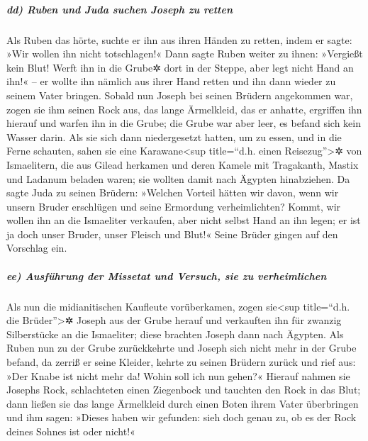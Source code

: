 \hypertarget{dd-ruben-und-juda-suchen-joseph-zu-retten}{%
\subparagraph{dd) Ruben und Juda suchen Joseph zu
retten}\label{dd-ruben-und-juda-suchen-joseph-zu-retten}}

 Als Ruben das hörte, suchte er ihn aus ihren Händen zu
retten, indem er sagte: »Wir wollen ihn nicht totschlagen!«
 Dann sagte Ruben weiter zu ihnen: »Vergießt kein Blut!
Werft ihn in die Grube✲ dort in der Steppe, aber legt nicht Hand an
ihn!« -- er wollte ihn nämlich aus ihrer Hand retten und ihn dann wieder
zu seinem Vater bringen.  Sobald nun Joseph bei seinen
Brüdern angekommen war, zogen sie ihm seinen Rock aus, das lange
Ärmelkleid, das er anhatte,  ergriffen ihn hierauf und
warfen ihn in die Grube; die Grube war aber leer, es befand sich kein
Wasser darin.  Als sie sich dann niedergesetzt hatten, um
zu essen, und in die Ferne schauten, sahen sie eine
Karawane\textless sup title=``d.h. einen Reisezug''\textgreater✲ von
Ismaelitern, die aus Gilead herkamen und deren Kamele mit Tragakanth,
Mastix und Ladanum beladen waren; sie wollten damit nach Ägypten
hinabziehen.  Da sagte Juda zu seinen Brüdern: »Welchen
Vorteil hätten wir davon, wenn wir unsern Bruder erschlügen und seine
Ermordung verheimlichten?  Kommt, wir wollen ihn an die
Ismaeliter verkaufen, aber nicht selbst Hand an ihn legen; er ist ja
doch unser Bruder, unser Fleisch und Blut!« Seine Brüder gingen auf den
Vorschlag ein.

\hypertarget{ee-ausfuxfchrung-der-missetat-und-versuch-sie-zu-verheimlichen}{%
\subparagraph{ee) Ausführung der Missetat und Versuch, sie zu
verheimlichen}\label{ee-ausfuxfchrung-der-missetat-und-versuch-sie-zu-verheimlichen}}

 Als nun die midianitischen Kaufleute vorüberkamen, zogen
sie\textless sup title=``d.h. die Brüder''\textgreater✲ Joseph aus der
Grube herauf und verkauften ihn für zwanzig Silberstücke an die
Ismaeliter; diese brachten Joseph dann nach Ägypten.  Als
Ruben nun zu der Grube zurückkehrte und Joseph sich nicht mehr in der
Grube befand, da zerriß er seine Kleider,  kehrte zu
seinen Brüdern zurück und rief aus: »Der Knabe ist nicht mehr da! Wohin
soll ich nun gehen?«  Hierauf nahmen sie Josephs Rock,
schlachteten einen Ziegenbock und tauchten den Rock in das Blut;
 dann ließen sie das lange Ärmelkleid durch einen Boten
ihrem Vater überbringen und ihm sagen: »Dieses haben wir gefunden: sieh
doch genau zu, ob es der Rock deines Sohnes ist oder nicht!«

